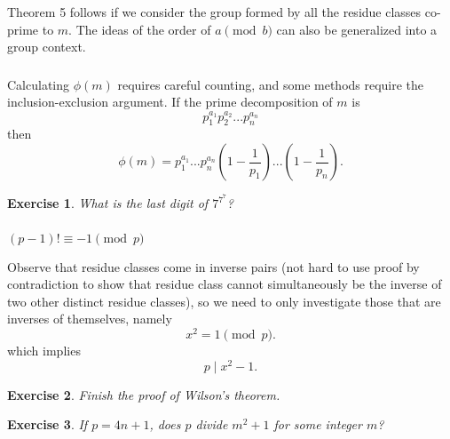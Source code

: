 \documentclass{article}
\newtheorem{exercise}{Exercise}
\begin{document}
\subsubsection{}
Theorem 5 follows if we consider the group formed by all the residue classes co-prime to $m$. The ideas of the order of $a \pmod{b}$ can also be generalized into a group context.

\subsubsection{}
Calculating $\phi(m)$ requires careful counting, and some methods require the inclusion-exclusion argument. If the prime decomposition of $m$ is
\begin{equation}
    p^{a_{1}}_{1}p^{a_{2}}_{2}...p^{a_{n}}_{n}
\end{equation}
then
\begin{equation}
    \phi(m) = p^{a_{1}}_{1}...p^{a_{n}}_{n}(1-\frac{1}{p_{1}})...(1-\frac{1}{p_{n}}).
\end{equation}
\begin{exercise}
    What is the last digit of $7^{7^{7}}$?
\end{exercise}

\subsubsection{}
\begin{thm}[Wilson]
    $(p-1)! \equiv -1 \pmod{p}$
\end{thm}
Observe that residue classes come in inverse pairs (not hard to use proof by contradiction to show that residue class cannot simultaneously be the inverse of two other distinct residue classes), so we need to only investigate those that are inverses of themselves, namely
\begin{equation}
    x^{2} = 1 \pmod{p}.
\end{equation}
which implies
\begin{equation}
    p \mid x^{2} -1.
\end{equation}
\begin{exercise}
    Finish the proof of Wilson's theorem.
\end{exercise}
\begin{exercise}
    If $p = 4n+1$, does $p$ divide $m^2+1$ for some integer $m$?
\end{exercise}
\end{document}
